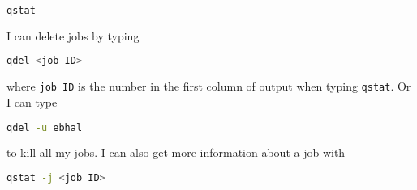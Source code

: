 \begin{lstlisting}[belowskip=-0.7cm, language=sh, numbers=none]
qstat
\end{lstlisting}

I can delete jobs by typing

\begin{lstlisting}[belowskip=-0.7cm, language=sh, numbers=none]
qdel <job ID>
\end{lstlisting}

where \verb!job ID! is the number in the first column of output when typing \verb!qstat!. Or I can type

\begin{lstlisting}[belowskip=-0.7cm, language=sh, numbers=none]
qdel -u ebhal
\end{lstlisting}

to kill all my jobs. I can also get more information about a job with

\begin{lstlisting}[belowskip=-0.7cm, language=sh, numbers=none]
qstat -j <job ID>
\end{lstlisting}
